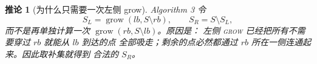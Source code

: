 \documentclass[UTF8]{ctexart}
\newtheorem{corollary}{推论}[section]
\begin{document}
\begin{corollary}[为什么只需要一次左侧 grow]
Algorithm 3 令
\[
S_L=\operatorname{grow}(lb,S\setminus rb),\qquad S_R=S\setminus S_L,
\]
而不是再单独计算一次 \(\operatorname{grow}(rb,S\setminus lb)\)。原因是：
左侧 \textsc{grow} 已经把所有不需要穿过 \(rb\) 就能从 \(lb\) 到达的点
全部吸走；剩余的点必然都通过 \(rb\) 所在一侧连通起来。因此取补集就得到
合法的 \(S_R\)。
\end{corollary}
\end{document}
